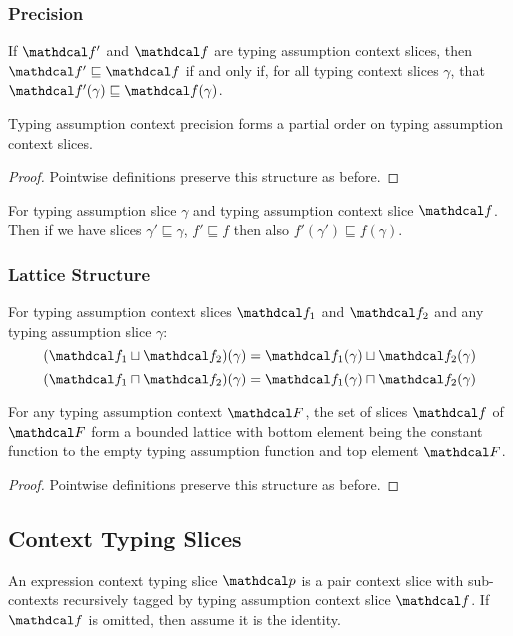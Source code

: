 \subsubsection{Precision}
\begin{definition}\label{def:FunctionPrecision}
If $\f'$ and $\f$ are typing assumption context slices, then $\f' \sqsubseteq \f$ if and only if, for all typing context slices $\gamma$, that $\f'(\gamma) \sqsubseteq \f(\gamma)$.
\end{definition}
\begin{proposition}
Typing assumption context precision forms a partial order on typing assumption context slices.
\end{proposition}
\begin{proof}
Pointwise definitions preserve this structure as before.
\end{proof}
\begin{proposition}
For typing assumption slice $\gamma$ and typing assumption context slice $\f$. Then if we have slices $\gamma' \sqsubseteq \gamma$, $f' \sqsubseteq f$ then also $f'(\gamma') \sqsubseteq f(\gamma)$.
\end{proposition}

\subsubsection{Lattice Structure}
\begin{definition} For typing assumption context slices $\f_1$ and $\f_2$ and any typing assumption slice $\gamma$:
\[(\f_1 \sqcup \f_2)(\gamma) = \f_1(\gamma) \sqcup \f_2(\gamma)\]
\[(\f_1 \sqcap \f_2)(\gamma) = \f_1(\gamma) \sqcap \f_2(\gamma)\]
\end{definition}

\begin{proposition}
For any typing assumption context $\F$, the set of slices $\f$ of $\F$ form a bounded lattice with bottom element being the constant function to the empty typing assumption function and top element $\F$.
\end{proposition}
\begin{proof}
Pointwise definitions preserve this structure as before.
\end{proof}

\subsection{Context Typing Slices}
\begin{definition}
An expression context typing slice $\p$ is a pair context slice with sub-contexts recursively tagged by typing assumption context slice $\f$. If $\f$ is omitted, then assume it is the identity.
\end{definition}
